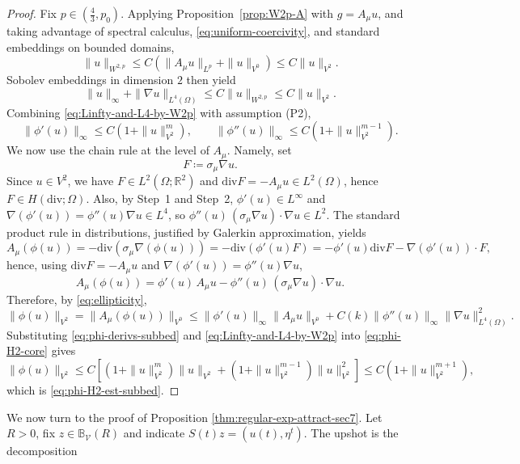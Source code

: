 \documentclass[12pt,leqno]{amsart}
\def\R {\mathbb{R}}
\theoremstyle{definition}
\numberwithin{equation}{section}
\numberwithin{figure}{section}
\begin{document}
\begin{proof} Fix $p  \in (\frac43,p_0)$.
Applying Proposition~\ref{prop:W2p-A} with $g=A_\mu u$, and taking advantage of spectral calculus, \eqref{eq:uniform-coercivity}, and standard embeddings on bounded domains,
\begin{equation}\label{eq:W2p-by-H2}
\|u\|_{W^{2,p}}
\le C\left(\|A_\mu u\|_{L^{p}}+\|u\|_{V^0}\right)
\le C\|u\|_{{V^2}}.
\end{equation}
  Sobolev embeddings in dimension $2$ then yield
\begin{equation}\label{eq:Linfty-and-L4-by-W2p}
\|u\|_{\infty}+\|\nabla u\|_{L^4(\Omega)}
\le C\|u\|_{W^{2,p}}
\le C\|u\|_{{V^2}}.
\end{equation}
Combining    \eqref{eq:Linfty-and-L4-by-W2p} with  assumption (P2),
\begin{equation}\label{eq:phi-derivs-subbed}
\|\phi'(u)\|_{\infty}\le  C\left(1+\|u\|_{{V^2}}^m\right),
\qquad
\|\phi''(u)\|_{\infty}\le   C\left(1+\|u\|_{{V^2}}^{m-1}\right).
\end{equation}
We now use the chain rule at the level of $A_\mu$. Namely,
set \[F\coloneqq \sigma_\mu\nabla u.\] Since $u\in {V^2}$, we have $F\in L^2(\Omega;\R^2)$ and
$\mathrm{div} F=-A_\mu u\in L^2(\Omega)$, hence $F\in H(\mathrm{div};\Omega)$. Also, by Step~1 and Step~2,
$\phi'(u)\in L^\infty$ and $\nabla(\phi'(u))=\phi''(u)\nabla u\in L^4$, so
$\phi''(u)\,(\sigma_\mu\nabla u)\cdot \nabla u \in L^2$.
The standard product rule in distributions, justified by Galerkin approximation, yields
\[
A_\mu(\phi(u))
=-\mathrm{div}\left(\sigma_\mu\nabla(\phi(u))\right)
=-\mathrm{div}\left(\phi'(u)F\right)
=-\phi'(u)\mathrm{div} F-\nabla(\phi'(u))\cdot F,
\]
hence, using $\mathrm{div} F=-A_\mu u$ and $\nabla(\phi'(u))=\phi''(u)\nabla u$,
\[
A_\mu(\phi(u))=\phi'(u)\,A_\mu u-\phi''(u)\,(\sigma_\mu\nabla u)\cdot\nabla u.
\]
Therefore, by \eqref{eq:ellipticity},
\begin{equation}\label{eq:phi-H2-core}
\|\phi(u)\|_{{V^2}}=\|A_\mu(\phi(u))\|_{V^0}
\le \|\phi'(u)\|_{\infty}\|A_\mu u\|_{V^0}
+ C(k)\|\phi''(u)\|_{\infty}\|\nabla u\|_{L^4(\Omega)}^2.
\end{equation}
Substituting \eqref{eq:phi-derivs-subbed} and \eqref{eq:Linfty-and-L4-by-W2p} into \eqref{eq:phi-H2-core} gives
\[
\|\phi(u)\|_{{V^2}}
\le C\left[(1+\|u\|_{{V^2}}^m)\|u\|_{{V^2}}+(1+\|u\|_{{V^2}}^{m-1})\|u\|_{{V^2}}^2\right]
\le C\left(1+\|u\|_{{V^2}}^{m+1}\right),
\]
which is \eqref{eq:phi-H2-est-subbed}.
\end{proof}
We now turn to the proof of Proposition \ref{thm:regular-exp-attract-sec7}. Let $R>0$, fix  $z\in \mathbb B_{\mathcal V}(R)$ and indicate $S(t)z=(u(t),\eta^t)$.   The upshot is  the decomposition
\end{document}
